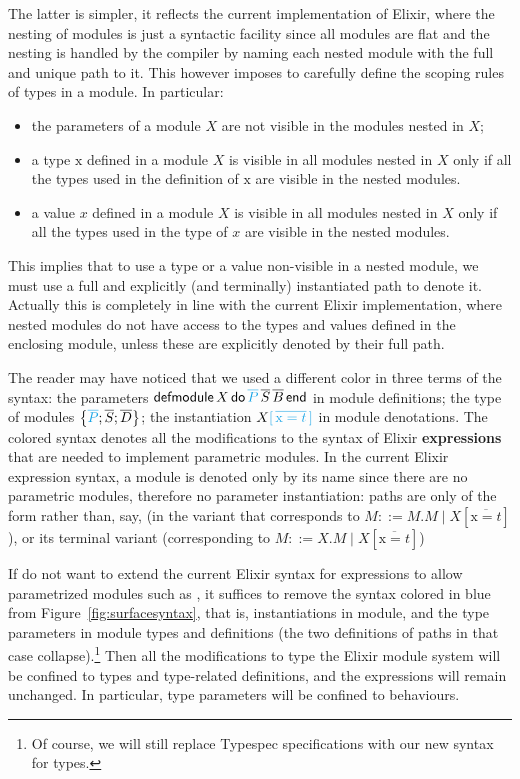 \documentclass[a4paper,10pt]{article}
\DeclareMathOperator{\kwend}{\textsf{end}}
\DeclareMathOperator{\kwdo}{\textsf{do}}
\DeclareMathOperator{\kwdefm}{\textsf{defmodule}}
\newcommand{\tx}{\textrm{x}}
\begin{document}
 The latter is simpler, it reflects the current implementation of Elixir, where the nesting of modules is just a syntactic facility since all modules are flat and the nesting is handled by the compiler by naming each nested module with the full and unique path to it. This however imposes to carefully define the scoping rules of types in a module. In particular:
 \begin{itemize}  
  \item the parameters of a module $X$ are not visible in the modules nested in $X$;
  \item a type $\tx$ defined in a module $X$ is visible in all modules nested in $X$ only if all the types used in the definition of $\tx$ are visible in the nested modules.
  \item a value $x$ defined in a module $X$ is visible in all modules nested in $X$ only if all the types used in the type of $x$ are visible in the nested modules.
 \end{itemize}
 This implies that to use a type or a value non-visible in a nested module, we must use a full and explicitly (and terminally) instantiated path to denote it.
 Actually this is completely in line with the current Elixir implementation, where nested modules do not have access to the types and values defined in the enclosing module, unless these are explicitly denoted by their full path.

The reader may have noticed that we used a different color in three terms of the syntax: the parameters $\kwdefm X \kwdo \textcolor{Cerulean}{\overline{P}}\, \overline{S}\, \overline{B} \kwend$ in module definitions; the type of modules $\left\{\textcolor{Cerulean}{\overline{P}};\overline{S};\overline{D}\right\}$; the instantiation $X\textcolor{Cerulean}{[\,\overline{\tx=t}\,]}$ in module denotations. The colored syntax denotes all the modifications to the syntax of Elixir \textbf{expressions} that are needed to implement parametric modules. In the current  Elixir expression syntax, a module is denoted only by its name since there are no parametric modules, therefore no parameter instantiation: paths are only of the form  rather than, say,  (in the variant that corresponds to $M::= M.M \mid X[\overline{\tx=t}]$), or its terminal variant  (corresponding to $M::= X.M\mid X[\overline{\tx=t}]$)

If do not want to extend the current Elixir syntax for expressions to allow parametrized modules such as , it suffices to remove the syntax colored in blue  from Figure~\ref{fig:surfacesyntax}, that is, instantiations in module, and the type parameters in module types and definitions (the two definitions of paths in that case collapse).\footnote{Of course, we will still replace Typespec specifications with our new syntax for types.} Then all the modifications to type the Elixir module system will be confined to types and type-related definitions, and the expressions will remain unchanged. In particular, type parameters will be confined to behaviours. 
\end{document}
